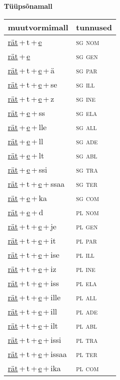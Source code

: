 
\vspace{1.8em}
\begin{minipage}{\textwidth}
\textbf{Tüüpsõnamall \,}\\

\begin{sideways}
\begin{tabular}{l l}
muutvormimall & tunnused \\
\hline
\underline{rät}\,+\,t\,+\,\underline{e} & \textsc{ sg nom } \\
\underline{rät}\,+\,\underline{e} & \textsc{ sg gen } \\
\underline{rät}\,+\,t\,+\,\underline{e}\,+\,ä & \textsc{ sg par } \\
\underline{rät}\,+\,t\,+\,\underline{e}\,+\,se & \textsc{ sg ill } \\
\underline{rät}\,+\,t\,+\,\underline{e}\,+\,z & \textsc{ sg ine } \\
\underline{rät}\,+\,\underline{e}\,+\,ss & \textsc{ sg ela } \\
\underline{rät}\,+\,\underline{e}\,+\,lle & \textsc{ sg all } \\
\underline{rät}\,+\,\underline{e}\,+\,ll & \textsc{ sg ade } \\
\underline{rät}\,+\,\underline{e}\,+\,lt & \textsc{ sg abl } \\
\underline{rät}\,+\,\underline{e}\,+\,ssi & \textsc{ sg tra } \\
\underline{rät}\,+\,t\,+\,\underline{e}\,+\,ssaa & \textsc{ sg ter } \\
\underline{rät}\,+\,\underline{e}\,+\,ka & \textsc{ sg com } \\
\underline{rät}\,+\,\underline{e}\,+\,d & \textsc{ pl nom } \\
\underline{rät}\,+\,t\,+\,\underline{e}\,+\,je & \textsc{ pl gen } \\
\underline{rät}\,+\,t\,+\,\underline{e}\,+\,it & \textsc{ pl par } \\
\underline{rät}\,+\,t\,+\,\underline{e}\,+\,ise & \textsc{ pl ill } \\
\underline{rät}\,+\,t\,+\,\underline{e}\,+\,iz & \textsc{ pl ine } \\
\underline{rät}\,+\,t\,+\,\underline{e}\,+\,iss & \textsc{ pl ela } \\
\underline{rät}\,+\,t\,+\,\underline{e}\,+\,ille & \textsc{ pl all } \\
\underline{rät}\,+\,t\,+\,\underline{e}\,+\,ill & \textsc{ pl ade } \\
\underline{rät}\,+\,t\,+\,\underline{e}\,+\,ilt & \textsc{ pl abl } \\
\underline{rät}\,+\,t\,+\,\underline{e}\,+\,issi & \textsc{ pl tra } \\
\underline{rät}\,+\,t\,+\,\underline{e}\,+\,issaa & \textsc{ pl ter } \\
\underline{rät}\,+\,t\,+\,\underline{e}\,+\,ika & \textsc{ pl com } \\
\end{tabular}
\end{sideways}
\label{tab:tüüpsõnamall-rätte}


\end{minipage}
